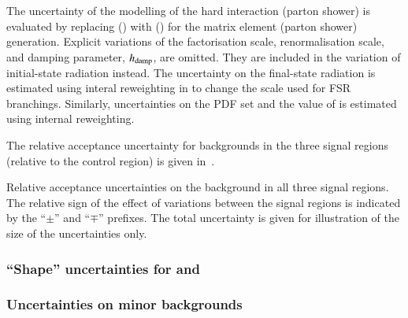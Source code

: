 The uncertainty of the modelling of the hard interaction (parton
shower) is evaluated by replacing \POWHEGBOX[v2] (\PYTHIA[8]) with
\MGNLO (\HERWIG[7]) for the matrix element (parton shower)
generation. Explicit variations of the factorisation scale,
renormalisation scale, and \PYTHIA[8] damping parameter, $h_\mathrm{damp}$, are
omitted. They are included in the variation of initial-state radiation
instead. The uncertainty on the final-state radiation is estimated
using interal reweighting in \PYTHIA[8] to change the scale used for
FSR branchings. Similarly, uncertainties on the PDF set and the value
of \alphas is estimated using internal reweighting.

The relative acceptance uncertainty for \ttbar backgrounds in the
three signal regions (relative to the \ZHF control region) is given
in~.

\begin{table}[htbp]
  \centering

  

  \caption{Relative acceptance uncertainties on the \ttbar background
    in all three signal regions. The relative sign of the effect of
    variations between the signal regions is indicated by the
    ``$\pm$'' and ``$\mp$'' prefixes. The total uncertainty is given
    for illustration of the size of the uncertainties only.}
  \label{tab:uncertainties_ttbar_extrapol}
\end{table}

\subsubsection{``Shape'' uncertainties for \ZHF and \ttbar}

%
%
%
%

\subsubsection{Uncertainties on minor backgrounds}

